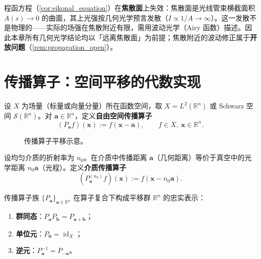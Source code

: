 \begin{remark}[焦散与程函方程的失效]\label{rem:caustic_eikonal_failure}
程函方程（\cref{cor:eikonal_equation}）在\textbf{焦散面}上失效：焦散面是光线管束横截面积 $A(s)\to 0$ 的曲面，其上光强按几何光学预言发散（$I\propto 1/A\to\infty$）。这一发散不是物理的——实际的场强在焦散附近有限，需用波动光学（Airy 函数）描述。因此本章所有几何光学结论均以「远离焦散面」为前提；焦散附近的波动修正属于\textbf{开放问题}（\cref{rem:propagation_open}）。
\end{remark}

\section{传播算子：空间平移的代数实现}\label{sec:propagation_operator}

\begin{definition}[自由空间传播算子]\label{def:propagation_operator}
设 $X$ 为场量（标量或向量分量）所在函数空间，取 $X = L^2(\mathbb{R}^n)$ 或 Schwarz 空间 $\mathcal{S}(\mathbb{R}^n)$。对 $\mathbf{a}\in\mathbb{R}^n$，定义\textbf{自由空间传播算子}
\[
(P_{\mathbf{a}} f)(\mathbf{x}) := f(\mathbf{x}-\mathbf{a}), \qquad f\in X,\ \mathbf{x}\in\mathbb{R}^n.
\]
\end{definition}

\begin{figure}[htbp]
\centering
{}
\caption{传播算子平移示意。}
\label{fig:propagation_operator}
\end{figure}

\begin{definition}[介质传播算子]\label{def:medium_propagation_operator}
设均匀介质的折射率为 $n_0$。在介质中传播距离 $\mathbf{a}$（几何距离）等价于真空中的光学距离 $n_0\mathbf{a}$（光程）。定义\textbf{介质传播算子}
\[
(P_{\mathbf{a}}^{(n_0)} f)(\mathbf{x}) := f(\mathbf{x}-n_0\mathbf{a}).
\]
\end{definition}

\begin{proposition}[传播算子的群结构]\label{prop:propagation_group}
传播算子族 $\{P_{\mathbf{a}}\}_{\mathbf{a}\in\mathbb{R}^n}$ 在算子复合下构成平移群 $\mathbb{R}^n$ 的忠实表示：
\begin{enumerate}[label=(\roman*)]
    \item \textbf{群同态}：$P_{\mathbf{a}}P_{\mathbf{b}} = P_{\mathbf{a}+\mathbf{b}}$；
    \item \textbf{单位元}：$P_{\mathbf{0}} = \operatorname{id}_X$；
    \item \textbf{逆元}：$P_{\mathbf{a}}^{-1} = P_{-\mathbf{a}}$。
\end{enumerate}
\end{proposition}

